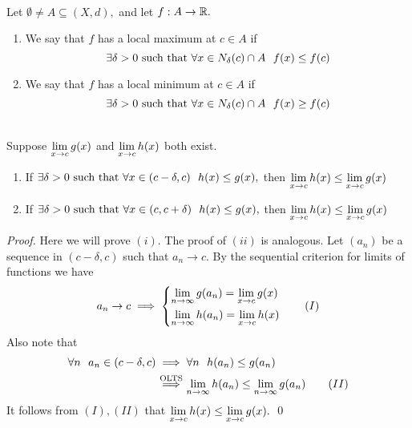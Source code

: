 \begin{definition} \leavevmode\\
    Let $\emptyset \not = A \subseteq (X, d),$ and let $f:A \to \mathbb{R}.$
    \begin{enumerate}[$(i)$]
        \item We say that $f$ has a local maximum at $c \in A$ if
        $$
        \exists \delta > 0 \text{ such that } \forall x \in N_{\delta}(c)\cap A ~~f(x)\leq f(c)
        $$
        \item We say that $f$ has a local minimum at $c \in A$ if 
        $$
        \exists \delta > 0 \text{ such that } \forall x \in N_{\delta}(c)\cap A ~~f(x) \geq f(c)
        $$
    \end{enumerate}
\end{definition}

\begin{lemma} \leavevmode\\
    Suppose $\lim \limits_{x \to c}g(x)$ and $\lim \limits_{x \to c}h(x)$ both exist.
    \begin{enumerate}[$(i)$]
    \item If $\exists \delta > 0 \text{ such that } \forall x \in (c-\delta, c) ~~h(x) \leq g(x),$ then $\lim \limits_{x \to c}h(x) \leq \lim \limits_{x \to c}g(x)$
    \item If $\exists \delta > 0 \text{ such that } \forall x \in (c, c + \delta) ~~h(x) \leq g(x),$ then $\lim \limits_{x \to c}h(x) \leq \lim \limits_{x \to c}g(x)$
    \end{enumerate}
\end{lemma}

\begin{proof}
    Here we will prove $(i)$. The proof of $(ii)$ is analogous. Let $(a_n)$ be a sequence in $(c-\delta, c)$ such that $a_n \to c.$ By the sequential criterion for limits of functions we have
    \begin{equation}
        a_n \to c \implies \begin{cases*}
            \lims{n}{\infty}g(a_n) = \lims{x}{c}g(x) \\
            \lims{n}{\infty}h(a_n) = \lims{x}{c}h(x)
        \end{cases*}
        \tag{$I$}
    \end{equation}
    Also note that
    \begin{align*}
        \forall n ~~a_n\in (c-\delta, c) &\implies \forall n ~~h(a_n) \leq g(a_n) \\
        &\overset{\text{OLTS}}{\implies} \lim \limits_{n \to \infty}h(a_n) \leq \lim \limits_{n \to \infty}g(a_n) \tag{$II$}
    \end{align*}
    It follows from $(I),(II)$ that $\lim \limits_{x \to c}h(x) \leq \lim \limits_{x \to c}g(x).$ \qed
\end{proof}

